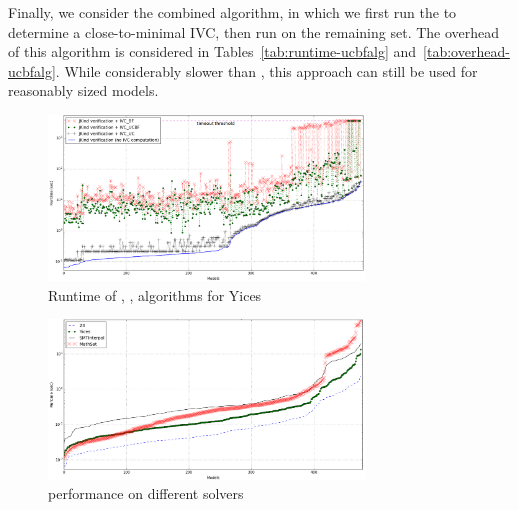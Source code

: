 
Finally, we consider the combined \ucbfalg algorithm, in which we
first run the \ucalg to determine a close-to-minimal IVC, then run
\bfalg on the remaining set. The overhead of this algorithm is
considered in Tables~\ref{tab:runtime-ucbfalg}
and~\ref{tab:overhead-ucbfalg}. While considerably slower than \ucalg,
this approach can still be used for reasonably sized models.

\begin{figure}
  \centering
  \includegraphics[width=0.75\textwidth]{figs/timing_analyses.png}
  \vspace{-0.1in}
  \caption{Runtime of \bfalg, \ucbfalg, \ucalg algorithms for Yices}\label{fig:runtimeall}
\end{figure}

\begin{figure}
  \centering
  \includegraphics[width=0.75\textwidth]{figs/performance.png}
  \vspace{-0.1in}
  \caption{\ucalg performance on different solvers}\label{fig:performance}
\end{figure}

